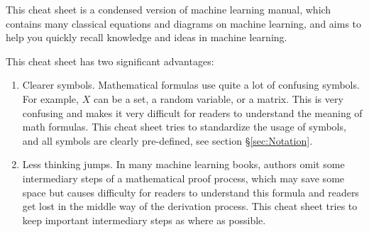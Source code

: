 %
%

\preface

This cheat sheet is a condensed version of machine learning manual, which contains many classical equations and diagrams on machine learning, and aims to help you quickly recall knowledge and ideas in machine learning.

This cheat sheet has two significant advantages:
\begin{enumerate}
\item Clearer symbols. Mathematical formulas use quite a lot of confusing symbols. For example, $X$ can be a set, a random variable, or a matrix. This is very confusing and makes it very difficult for readers to understand the meaning of math formulas. This cheat sheet tries to standardize the usage of symbols, and all symbols are clearly pre-defined, see section \S \ref{sec:Notation}.
\item Less thinking jumps. In many machine learning books, authors omit some intermediary steps of a mathematical proof process, which may save some space but causes difficulty for readers to understand this formula and readers get lost in the middle way of the derivation process. This cheat sheet tries to keep important intermediary steps as where as possible.
\end{enumerate}

